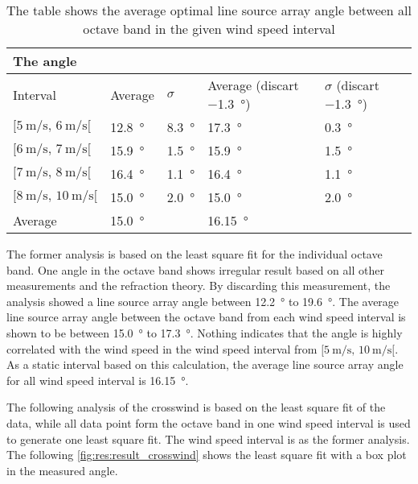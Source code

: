   \begin{table}[H]
 \centering
  \caption{The table shows the average optimal line source array angle between all octave band  in the given wind speed interval}
\begin{tabular}{l|l|l|l|l}
\multicolumn{2}{l}{The angle}      \\ \hline
Interval & Average  & $\sigma$ & Average (discart  \SI{-1.3}{\degree}) & $\sigma$ (discart  \SI{-1.3}{\degree}) \\ \hline
  $[\SI{5}{\meter\per\second},\, \SI{6}{\meter\per\second}[ $       &   \SI{12.8}{\degree}  &   \SI{8.3}{\degree}  &   \SI{17.3}{\degree}   &   \SI{0.3}{\degree}\\
    $[\SI{6}{\meter\per\second},\, \SI{7}{\meter\per\second}[ $     &   \SI{15.9}{\degree}   &   \SI{1.5}{\degree} &   \SI{15.9}{\degree}   &   \SI{1.5}{\degree}\\
  $[\SI{7}{\meter\per\second},\, \SI{8}{\meter\per\second}[ $       &    \SI{16.4}{\degree}  &   \SI{1.1}{\degree} &    \SI{16.4}{\degree}&    \SI{1.1}{\degree}  \\
   $[\SI{8}{\meter\per\second},\, \SI{10}{\meter\per\second}[ $      &     \SI{15.0}{\degree}  &   \SI{2.0}{\degree} &     \SI{15.0}{\degree} &     \SI{2.0}{\degree} \\ \hline
    Average      &     \SI{15.0}{\degree} &  &\SI{16.15}{\degree}&
\end{tabular}
\label{res:tab:cross_mean}
\end{table}  
 
The former analysis is based on the least square fit for the individual octave band. One angle in the  octave band shows irregular result based on all other measurements and the refraction theory. By discarding this measurement, the analysis showed a line source array angle between  \SI{12.2}{\degree} to  \SI{19.6}{\degree}. The average line source array angle between the octave band from each wind speed interval is shown to be between \SI{15.0}{\degree} to \SI{17.3}{\degree}. Nothing indicates that the angle is highly correlated with the wind speed in the  wind speed interval from $[\SI{5}{\meter\per\second},\, \SI{10}{\meter\per\second}[ $. As a static interval based on this calculation, the average line source array angle for all wind speed interval is \SI{16.15}{\degree}.

The following analysis of the crosswind is based on the least square fit of the data, while all data point form the octave band in one wind speed interval is used to generate one least square fit. The wind speed interval is as the former analysis. The following \autoref{fig:res:result_crosswind} shows the least square fit with a box plot in the measured angle. 
 

